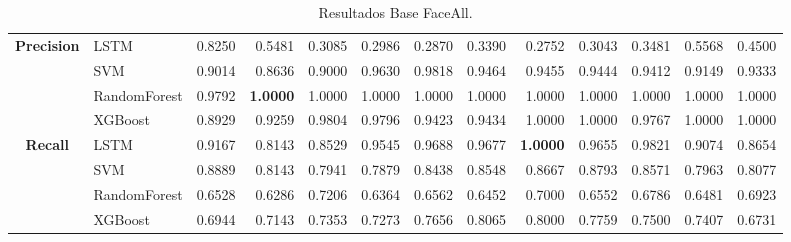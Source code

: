 \begin{table}[h]
\begin{adjustbox}{max width=15cm}
\begin{tabular}{|c|l|r|r|r|r|r|r|r|r|r|r|r|}
			\hline
			\textbf{Precision} & LSTM &  0.8250 &  0.5481 &  0.3085 &  0.2986 &  0.2870 &  0.3390 &  0.2752 &  0.3043 &  0.3481 &  0.5568 &  0.4500 \\
			& SVM &  0.9014 &  0.8636 &  0.9000 &  0.9630 &  0.9818 &  0.9464 &  0.9455 &  0.9444 &  0.9412 &  0.9149 &  0.9333 \\
			& RandomForest &  0.9792 &  \textbf{1.0000} &  1.0000 &  1.0000 &  1.0000 &  1.0000 &  1.0000 &  1.0000 &  1.0000 &  1.0000 &  1.0000 \\
			& XGBoost &  0.8929 &  0.9259 &  0.9804 &  0.9796 &  0.9423 &  0.9434 &  1.0000 &  1.0000 &  0.9767 &  1.0000 &  1.0000 \\
			\hline
			\textbf{Recall} & LSTM &  0.9167 &  0.8143 &  0.8529 &  0.9545 &  0.9688 &  0.9677 &  \textbf{1.0000} &  0.9655 &  0.9821 &  0.9074 &  0.8654 \\
			& SVM &  0.8889 &  0.8143 &  0.7941 &  0.7879 &  0.8438 &  0.8548 &  0.8667 &  0.8793 &  0.8571 &  0.7963 &  0.8077 \\
			& RandomForest &  0.6528 &  0.6286 &  0.7206 &  0.6364 &  0.6562 &  0.6452 &  0.7000 &  0.6552 &  0.6786 &  0.6481 &  0.6923 \\
			& XGBoost &  0.6944 &  0.7143 &  0.7353 &  0.7273 &  0.7656 &  0.8065 &  0.8000 &  0.7759 &  0.7500 &  0.7407 &  0.6731 \\
			\hline
		\end{tabular}
	\end{adjustbox}
	\caption{Resultados Base FaceAll.}
	\label{tab:faceAllBase}
\end{table}

